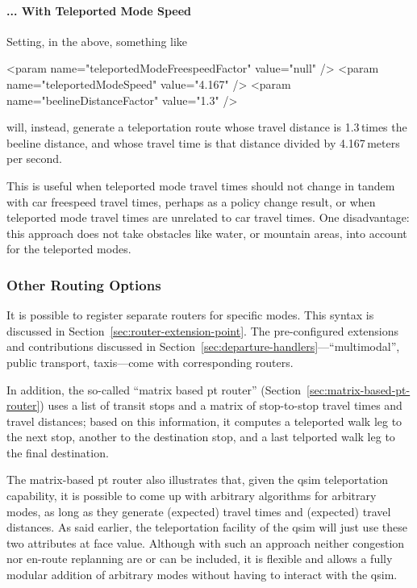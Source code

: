 \paragraph{... With Teleported Mode Speed}  Setting, in the above, something like
\begin{xml}
      <param name="teleportedModeFreespeedFactor" value="null" />
      <param name="teleportedModeSpeed" value="4.167" />
      <param name="beelineDistanceFactor" value="1.3" />
\end{xml}
will, instead, generate a teleportation route whose travel distance is 1.3\,times the beeline distance, and whose travel time is that distance divided by 4.167\,meters per second.

This is useful when teleported mode travel times should not change in tandem with car freespeed travel times, perhaps as a policy change result, or when teleported mode travel times are unrelated to car travel times.  One disadvantage: this approach does not take obstacles like water, or mountain areas, into account for the teleported modes.

\subsubsection{Other Routing Options}
It is possible to register separate routers for specific modes.  This syntax is discussed in Section~\ref{sec:router-extension-point}.  The pre-configured extensions and contributions discussed in Section~\ref{sec:departure-handlers}---``multimodal'', public transport, taxis---come with corresponding routers.  

In addition, the so-called ``matrix based pt router'' (Section~\ref{sec:matrix-based-pt-router}) uses a list of transit stops and a matrix of stop-to-stop travel times and travel distances; based on this information, it computes a teleported walk leg to the next stop, another to the destination stop, and a last telported walk leg to the final destination.

The matrix-based pt router also illustrates that, given the \gls{qsim} teleportation capability, it is possible to come up with arbitrary algorithms for arbitrary modes, as long as they generate (expected) travel times and (expected) travel distances.  As said earlier, the \gls{teleportation} facility of the \gls{qsim} will just use these two attributes at face value.  Although with such an approach neither congestion nor en-route replanning are or can be included, it is flexible and allows a fully modular addition of arbitrary modes without having to interact with the \gls{qsim}.

